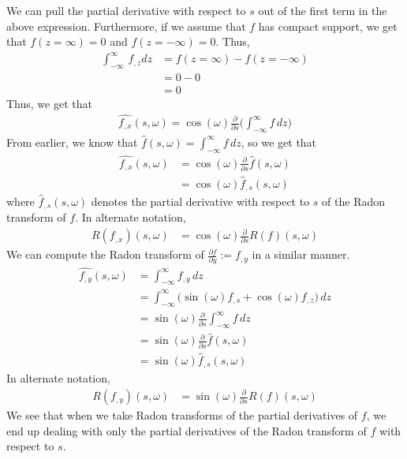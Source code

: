 We can pull the partial derivative with respect to $s$ out of the first term in the above expression.
Furthermore, if we assume that $f$ has compact support, we get that $f(z = \infty) = 0$ and $f(z = -\infty) = 0$.
Thus,
\begin{align*}
	\int_{-\infty}^{\infty} \, f_{, z} dz & = f(z = \infty) - f(z = -\infty) \\
									   & = 0 - 0 \\
									   & = 0
\end{align*}
Thus, we get that
\begin{align*}
	\widehat{f_{, x}}(s, \omega) = \cos (\omega) \frac{\partial}{\partial s} \Bigg( \int_{-\infty}^{\infty} f \, dz \Bigg)
\end{align*}
From earlier, we know that $\hat{f}(s, \omega) = \int_{-\infty}^{\infty} f \, dz$, so we get that
\begin{align*}
	\widehat{f_{, x}}(s, \omega) & = \cos (\omega) \frac{\partial}{\partial s} \hat{f} (s, \omega) \\
								 & = \cos (\omega) \hat{f}_{, s} (s, \omega)
\end{align*}
where $\hat{f}_{, s} (s, \omega)$ denotes the partial derivative with respect to $s$ of the Radon transform of $f$.
In alternate notation,
\begin{align*}
	R(f_{, x}) (s, \omega) & = \cos (\omega) \frac{\partial}{\partial s} R(f) (s, \omega)
\end{align*}
We can compute the Radon transform of $\frac{\partial f}{\partial y} := f_{, y}$ in a similar manner.
\begin{align*}
	\widehat{f_{, y}}(s, \omega) & = \int_{-\infty}^{\infty} f_{, y} \, dz \\
								 & = \int_{-\infty}^{\infty} \Big( \sin(\omega) f_{, s} + \cos (\omega) f_{, z} \Big) \, dz \\
								 & = \sin (\omega) \frac{\partial}{\partial s} \int_{-\infty}^{\infty} f \, dz \\
								 & = \sin(\omega) \frac{\partial}{\partial s} \hat{f} (s, \omega) \\
								 & = \sin (\omega) \hat{f}_{, s} (s, \omega)
\end{align*}
In alternate notation,
\begin{align*}
	R(f_{, y}) (s, \omega) & = \sin (\omega) \frac{\partial}{\partial s} R(f) (s, \omega)
\end{align*}
We see that when we take Radon transforms of the partial derivatives of $f$, we end up dealing with only the partial derivatives of the Radon transform of $f$ with respect to $s$.